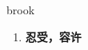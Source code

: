 
\begin{frame}
{\huge brook}
\begin{center}
\begin{enumerate}\Large
  \item \textbf{忍受，容许}
\end{enumerate}
\end{center}
\end{frame}
